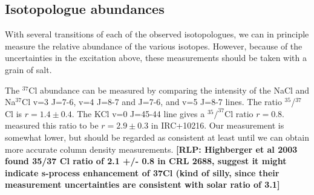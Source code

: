 \documentclass[twocolumn]{aastex62}
\newcommand{\bam}[1]{\textcolor{green!65!black}{\textbf{[BAM: #1]}}}
\newcommand{\rlp}[1]{\textcolor{blue!65!black}{\textbf{[RLP: #1]}}}
\newcommand{\ag}[1]{\textcolor{red!65!black}{\textbf{[AG: #1]}}}
\begin{document}

%

\subsection{Isotopologue abundances}
With several transitions of each of the observed isotopologues, we can in
principle measure the relative abundance of the various isotopes.  However,
because of the uncertainties in the excitation above, these measurements should
be taken with a grain of salt.

The $^{37}$Cl abundance can be measured by comparing the intensity of the
NaCl and Na$^{37}$Cl v=3 J=7-6, v=4 J=8-7 and J=7-6, and v=5 J=8-7 lines.
The ratio $^{35}$/$^{37}$Cl is $r=1.4\pm0.4$.  The KCl v=0 J=45-44 line
gives a $^{35}/^{37}$Cl ratio $r=0.8$.  \citet{Agundez2012a} measured
this ratio to be $r=2.9\pm0.3$ in IRC+10216.  Our measurement is somewhat lower,
but should be regarded as consistent at least until we can obtain more
accurate column density measurements. \rlp{Highberger et al 2003 found 35/37 Cl
ratio of 2.1 +/- 0.8 in CRL 2688, suggest it might indicate s-process enhancement
of 37Cl (kind of silly, since their measurement uncertainties are consistent
with solar ratio of 3.1} 
\end{document}
